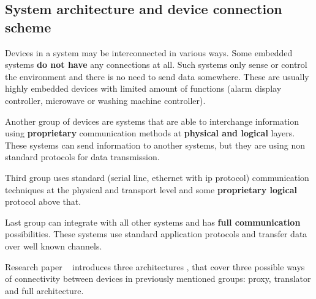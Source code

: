 \subsection{System architecture and  device connection scheme}
\label{sec:device_connection_scheme}
Devices in a system may be interconnected in various ways.
Some embedded systems \textbf{do not have} any connections at all. 
Such systems only sense or control the environment and there is no need to
send data somewhere. These are usually highly embedded devices with limited
amount of functions (alarm display controller, microwave or washing machine
controller).

Another group of devices are systems that are able to interchange
information using \textbf{proprietary} communication methods at \textbf{physical
and logical} layers. These systems can send information to another systems, but
they are using non standard protocols for data transmission.

Third group uses standard (serial line, ethernet with ip protocol)
communication techniques at the physical and transport level and some \textbf{proprietary
logical} protocol above that.

Last group can integrate with all other systems and has \textbf{full
communication} possibilities. These systems use standard application protocols
and transfer data over well known channels.

Research paper ~\cite{lws_milanovic.pdf} introduces three architectures , that
cover three possible ways of connectivity between devices in previously 
mentioned groups: proxy, translator and full architecture.



